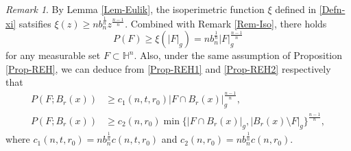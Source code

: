 \documentclass[11pt,reqno]{amsart}
\theoremstyle{definition}
\theoremstyle{remark}
\newtheorem{rem}{Remark}
\numberwithin{equation}{section}
\renewcommand{\(}{\left(}
\renewcommand{\)}{\right)}
\renewcommand{\-}{\overline}
\begin{document}
\begin{rem}\label{Rem-IsoE}
	By Lemma \ref{Lem-Eulik}, the isoperimetric function $\xi$ defined in \eqref{Defn-xi} satsifies $\xi(z)\geq n b_n^{\frac{1}{n}}z^{\frac{n-1}{n}}$. Combined with Remark \ref{Rem-Iso}, there holds
	\begin{equation}\label{Eq-HEin}
		P(F)\geq \xi(|F|_g)=n b_n^{\frac{1}{n}}|F|_g^{\frac{n-1}{n}}
	\end{equation}
	for any measurable set $F\subset\mathbb{H}^n$. Also, under the same assumption of Proposition \ref{Prop-REH}, we can deduce from \eqref{Prop-REH1} and \eqref{Prop-REH2} respectively that 
	\begin{align}
		P(F;B_r(x))&\geq c_1(n,t,r_0)|F\cap B_r(x)|_g^{\frac{n-1}{n}},\label{Rem-Eulik1}\\
		P(F;B_r(x))&\geq c_2(n,r_0)\min\{|F\cap B_r(x)|_g, |B_r(x)\setminus F|_g\}^{\frac{n-1}{n}}\label{Rem-Eulik2},
	\end{align}
	where $c_1(n,t,r_0)=n b_n^{\frac{1}{n}}c(n,t,r_0)$ and $c_2(n,r_0)=n b_n^{\frac{1}{n}}c(n,r_0)$.
\end{rem}
\end{document}
